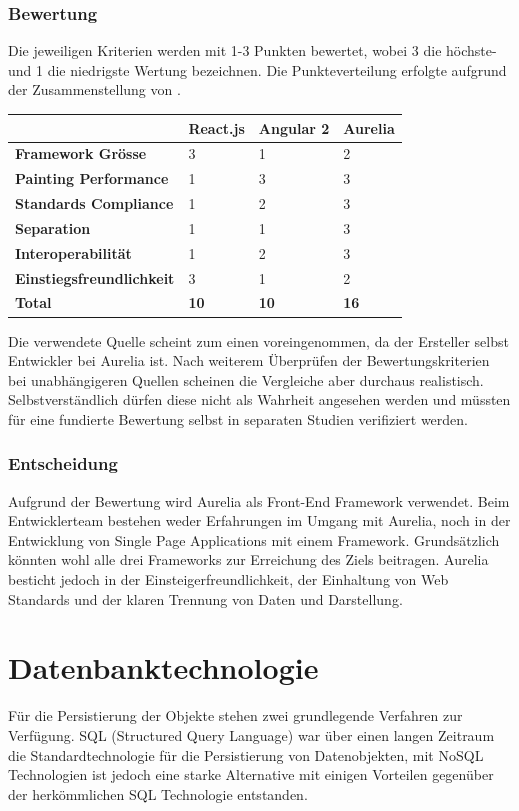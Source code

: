 \subsubsection{Bewertung}
Die jeweiligen Kriterien werden mit 1-3 Punkten bewertet, wobei 3 die höchste- und 1 die niedrigste Wertung bezeichnen. Die Punkteverteilung erfolgte aufgrund der Zusammenstellung von \cite{EisenbergYoutube}. 

\begin{longtable}{| p{5.4cm} | p{3.4cm} | p{3.4cm} | p{3.4cm} |}
\hline 
 &\textbf{React.js} & \textbf{Angular 2} & \textbf{Aurelia}
\\ \hline
\textbf{Framework Grösse} & 3 & 1 & 2
\\ \hline
\textbf{Painting Performance} & 1 & 3 & 3
\\ \hline
\textbf{Standards Compliance} & 1 & 2 & 3
\\ \hline
\textbf{Separation} & 1 & 1 & 3
\\ \hline
\textbf{Interoperabilität} & 1 & 2 & 3
\\ \hline
\textbf{Einstiegsfreundlichkeit} & 3 & 1 & 2
\\ \hline
\textbf{Total} & \textbf{10} & \textbf{10} & \textbf{16} 
\\ \hline
\end{longtable}
Die verwendete Quelle scheint zum einen voreingenommen, da der Ersteller selbst Entwickler bei Aurelia ist. Nach weiterem Überprüfen der Bewertungskriterien bei unabhängigeren Quellen scheinen die Vergleiche aber durchaus realistisch. Selbstverständlich dürfen diese nicht als Wahrheit angesehen werden und müssten für eine fundierte Bewertung selbst in separaten Studien verifiziert werden.
\subsubsection{Entscheidung}
Aufgrund der Bewertung wird Aurelia als Front-End Framework verwendet. Beim Entwicklerteam bestehen weder Erfahrungen im Umgang mit Aurelia, noch in der Entwicklung von Single Page Applications mit einem Framework. Grundsätzlich könnten wohl alle drei Frameworks zur Erreichung des Ziels beitragen. Aurelia besticht jedoch in der Einsteigerfreundlichkeit, der Einhaltung von Web Standards und der klaren Trennung von Daten und Darstellung.

\newpage
\section{Datenbanktechnologie}
Für die Persistierung der Objekte stehen zwei grundlegende Verfahren zur Verfügung. SQL (Structured Query Language) war über einen langen Zeitraum die Standardtechnologie für die Persistierung von Datenobjekten, mit NoSQL Technologien ist jedoch eine starke Alternative mit einigen Vorteilen gegenüber der herkömmlichen SQL Technologie entstanden.

